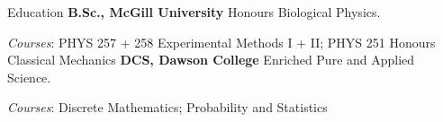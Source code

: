 \begin{rubric}{Education}
%
	\textbf{B.Sc., McGill University} Honours Biological Physics.

	\hspace{0.25cm}\textit{Courses}: PHYS 257 + 258 Experimental Methods I + II; PHYS 251 Honours Classical Mechanics
%
\entry*[2023 -- 2025]%
	\textbf{DCS, Dawson College} Enriched Pure and Applied Science.

	\hspace{0.25cm}\textit{Courses}: Discrete Mathematics; Probability and Statistics
%
\end{rubric}